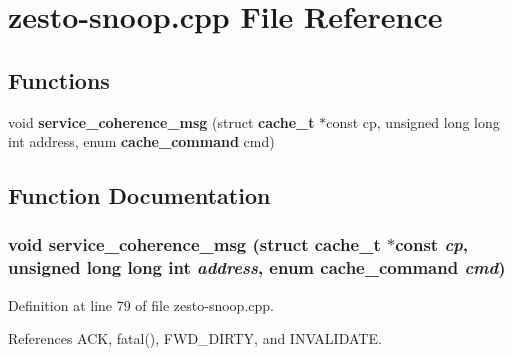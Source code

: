 \section{zesto-snoop.cpp File Reference}
\label{zesto-snoop_8cpp}
\subsection*{Functions}
\begin{CompactItemize}
\item 
void {\bf service\_\-coherence\_\-msg} (struct {\bf cache\_\-t} $\ast$const cp, unsigned long long int address, enum {\bf cache\_\-command} cmd)
\end{CompactItemize}


\subsection{Function Documentation}
\subsubsection[{service\_\-coherence\_\-msg}]{\setlength{\rightskip}{0pt plus 5cm}void service\_\-coherence\_\-msg (struct {\bf cache\_\-t} $\ast$const  {\em cp}, \/  unsigned long long int {\em address}, \/  enum {\bf cache\_\-command} {\em cmd})}\label{zesto-snoop_8cpp_c0b406576e7aeb65e502b29488bdbdd4}




Definition at line 79 of file zesto-snoop.cpp.

References ACK, fatal(), FWD\_\-DIRTY, and INVALIDATE.